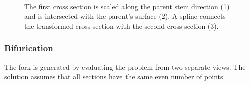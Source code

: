 \documentclass[10pt]{article}
\begin{document}
\begin{figure}[H]
\centering
 \\
\caption{The first cross section is scaled along the parent stem direction (1) and is intersected with the parent's surface (2). A spline connects the transformed cross section with the second cross section (3).}
\end{figure}

\subsubsection{Bifurication}

The fork is generated by evaluating the problem from two separate views. The solution assumes that all sections have the same even number of points.
\end{document}
